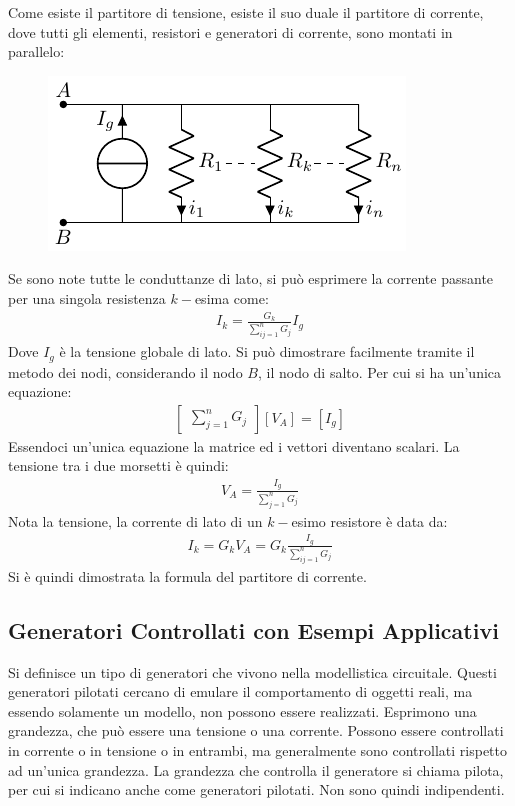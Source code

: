 \documentclass{article}
\numberwithin{equation}{subsection}
\begin{document}
Come esiste il partitore di tensione, esiste il suo duale il partitore di corrente, dove tutti gli elementi, resistori e generatori di corrente, sono montati in parallelo:
\begin{figure}[H]%
    \centering
    \includegraphics{partitore-corrente.pdf}%
    \label{fig:partitore-corrente}
\end{figure}
Se sono note tutte le conduttanze di lato, si può esprimere la corrente passante per una singola resistenza $k-$esima come:
\begin{gather}
    I_k=\displaystyle\frac{G_k}{\sum_{ij=1}^n G_j}I_g
\end{gather}
Dove $I_g$ è la tensione globale di lato. 
Si può dimostrare facilmente tramite il metodo dei nodi, considerando il nodo $B$, il nodo di salto. Per cui si ha un'unica equazione:
\begin{gather*}
    \begin{bmatrix}
        \displaystyle\sum_{j=1}^nG_j
    \end{bmatrix}[V_A]=[I_g]
\end{gather*}
Essendoci un'unica equazione la matrice ed i vettori diventano scalari. La tensione tra i due morsetti è quindi:
\begin{gather*}
    V_A=\displaystyle\frac{I_g}{\sum_{j=1}^nG_j}
\end{gather*} 
Nota la tensione, la corrente di lato di un $k-$esimo resistore è data da:
\begin{gather*}
    I_k=G_kV_A=\displaystyle G_k\frac{I_g}{\sum_{ij=1}^n G_j}
\end{gather*}
Si è quindi dimostrata la formula del partitore di corrente. 

\subsection{Generatori Controllati con Esempi Applicativi}

Si definisce un tipo di generatori che vivono nella modellistica circuitale. Questi generatori pilotati cercano di emulare il comportamento di oggetti reali, ma essendo 
solamente un modello, non possono essere realizzati. 
Esprimono una grandezza, che può essere una tensione o una corrente. Possono essere controllati in corrente o in tensione o in entrambi, ma generalmente sono controllati 
rispetto ad un'unica grandezza. La grandezza che controlla il generatore si chiama pilota, per cui si indicano anche come generatori pilotati. Non sono quindi indipendenti. 
\end{document}
